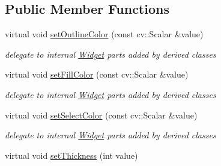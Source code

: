 \subsection*{Public Member Functions}
\begin{DoxyCompactItemize}
\item 
virtual void \hyperlink{classcanvascv_1_1CompoundWidget_a89acccaf003b00ec8310484e321d74a0}{set\+Outline\+Color} (const cv\+::\+Scalar \&value)\hypertarget{classcanvascv_1_1CompoundWidget_a89acccaf003b00ec8310484e321d74a0}{}\label{classcanvascv_1_1CompoundWidget_a89acccaf003b00ec8310484e321d74a0}

\begin{DoxyCompactList}\small\item\em delegate to internal \hyperlink{classcanvascv_1_1Widget}{Widget} parts added by derived classes \end{DoxyCompactList}\item 
virtual void \hyperlink{classcanvascv_1_1CompoundWidget_ae5b81096c6436130475e977e894257d9}{set\+Fill\+Color} (const cv\+::\+Scalar \&value)\hypertarget{classcanvascv_1_1CompoundWidget_ae5b81096c6436130475e977e894257d9}{}\label{classcanvascv_1_1CompoundWidget_ae5b81096c6436130475e977e894257d9}

\begin{DoxyCompactList}\small\item\em delegate to internal \hyperlink{classcanvascv_1_1Widget}{Widget} parts added by derived classes \end{DoxyCompactList}\item 
virtual void \hyperlink{classcanvascv_1_1CompoundWidget_a59188d0a0a947dab227b2b26263e8698}{set\+Select\+Color} (const cv\+::\+Scalar \&value)\hypertarget{classcanvascv_1_1CompoundWidget_a59188d0a0a947dab227b2b26263e8698}{}\label{classcanvascv_1_1CompoundWidget_a59188d0a0a947dab227b2b26263e8698}

\begin{DoxyCompactList}\small\item\em delegate to internal \hyperlink{classcanvascv_1_1Widget}{Widget} parts added by derived classes \end{DoxyCompactList}\item 
virtual void \hyperlink{classcanvascv_1_1CompoundWidget_abc8be92c3042fe25004c0638b64251b6}{set\+Thickness} (int value)\hypertarget{classcanvascv_1_1CompoundWidget_abc8be92c3042fe25004c0638b64251b6}{}\label{classcanvascv_1_1CompoundWidget_abc8be92c3042fe25004c0638b64251b6}


\end{DoxyCompactItemize}
